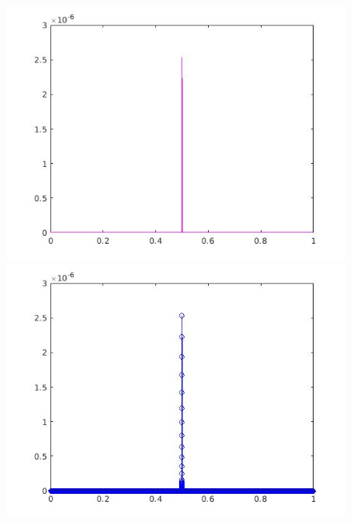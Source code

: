 \documentclass[a4paper,11pt]{article}
\begin{document}
\begin{figure}[!hp]
\centering
\begin{minipage}{.5\textwidth}
  \centering
  \includegraphics[width=1\linewidth]{images/lab2_78.jpg}
\end{minipage}%
\begin{minipage}{.5\textwidth}
  \centering
  \includegraphics[width=1\linewidth]{images/lab2_79.jpg}
\end{minipage}
\end{figure}

\newpage
\end{document}
